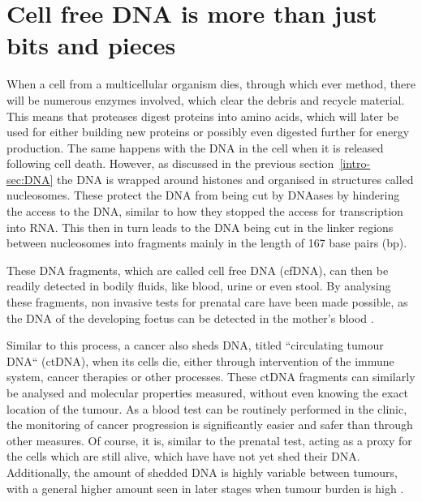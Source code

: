 \section[cfDNA]{Cell free DNA is more than just bits and pieces}
\label{intro-sec:ctDNA}

When a cell from a multicellular organism dies, through which ever method, there will be numerous enzymes involved, which clear the debris and recycle material. This means that proteases digest proteins into amino acids, which will later be used for either building new proteins or possibly even digested further for energy production. The same happens with the DNA in the cell when it is released following cell death. However, as discussed in the previous section~\ref{intro-sec:DNA} the DNA is wrapped around histones and organised in structures called nucleosomes. These protect the DNA from being cut by DNAases by hindering the access to the DNA, similar to how they stopped the access for transcription into RNA. This then in turn leads to the DNA being cut in the linker regions between nucleosomes into fragments mainly in the length of 167 base pairs (bp). 

These DNA fragments, which are called cell free DNA (cfDNA), can then be readily detected in bodily fluids, like blood, urine or even stool. By analysing these fragments, non invasive tests for prenatal care have been made possible, as the DNA of the developing foetus can be detected in the mother's blood \cite{Dan2012,Nicolaides2013}.

Similar to this process, a cancer also sheds DNA, titled ``circulating tumour DNA`` (ctDNA), when its cells die, either through intervention of the immune system, cancer therapies or other processes. These ctDNA fragments can similarly be analysed and molecular properties measured, without even knowing the exact location of the tumour. As a blood test can be routinely performed in the clinic, the monitoring of cancer progression is significantly easier and safer than through other measures. Of course, it is, similar to the prenatal test, acting as a proxy for the cells which are still alive, which have have not yet shed their DNA. Additionally, the amount of shedded DNA is highly variable between tumours, with a general higher amount seen in later stages when tumour burden is high \cite{Diehl2008,Schwarzenbach2011}.

